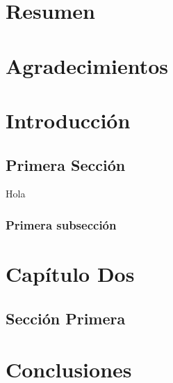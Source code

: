\documentclass[a4paper,11pt,oneside]{book}
\begin{document}
\chapter*{Resumen}


\chapter*{Agradecimientos}


\tableofcontents


\chapter{Introducción}



\section{Primera Sección}
\label{sec:PrimeraSeccion}
\indent Hola \cite{2}\cite{3}\cite{1}\cite{4}

\subsection{Primera subsección}
\label{sec:Primerasubseccion}


\chapter{Capítulo Dos}
\label{sec:CapituloDos}

\section{Sección Primera}
\label{sec:SeccionPrimera}

\chapter{Conclusiones}




\end{document}
